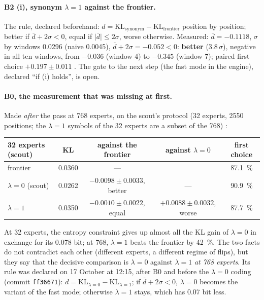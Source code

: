 \paragraph{B2 (i), synonym $\lambda = 1$ against the frontier.} The rule, declared beforehand: $d = \mathrm{KL}_{\text{synonym}} - \mathrm{KL}_{\text{frontier}}$ position by position; better if $\bar d + 2\sigma < 0$, equal if $\lvert \bar d\rvert \le 2\sigma$, worse otherwise. Measured: $\bar d = -\num{0.1118}$, $\sigma$ by windows \num{0.0296} (naive \num{0.0045}), $\bar d + 2\sigma = -\num{0.052} < 0$: \textbf{better} (\num{3.8}\,$\sigma$), negative in all ten windows, from $-\num{0.036}$ (window 4) to $-\num{0.345}$ (window 7); paired first choice $+\num{0.197} \pm \num{0.011}$ \mes. The gate to the next step (the fast mode in the engine), declared ``if (i) holds'', is open.

\paragraph{B0, the measurement that was missing at first.} Made \emph{after} the pass at 768 experts, on the scout's protocol (32 experts, \num{2550} positions; the $\lambda = 1$ symbols of the 32 experts are a subset of the 768) \mes:

\begin{center}\footnotesize
\begin{tabular}{@{}lcccc@{}}
\toprule
32 experts (scout) & KL & against the frontier & against $\lambda = 0$ & first choice \\
\midrule
frontier & \num{0.0360} & --- & & \SI{87.1}{\percent} \\
$\lambda = 0$ (scout) & \num{0.0262} & $-\num{0.0098} \pm \num{0.0033}$, better & --- & \SI{90.9}{\percent} \\
$\lambda = 1$ & \num{0.0350} & $-\num{0.0010} \pm \num{0.0022}$, equal & $+\num{0.0088} \pm \num{0.0032}$, worse & \SI{87.7}{\percent} \\
\bottomrule
\end{tabular}
\end{center}

At 32 experts, the entropy constraint gives up almost all the KL gain of $\lambda = 0$ in exchange for its \num{0.078} bit; at 768, $\lambda = 1$ beats the frontier by \SI{42}{\percent}. The two facts do not contradict each other (different experts, a different regime of flips), but they say that the decisive comparison is $\lambda = 0$ against $\lambda = 1$ \emph{at 768 experts}. Its rule was declared on 17 October at 12:15, after B0 and before the $\lambda = 0$ coding (commit \texttt{ff36671}): $d = \mathrm{KL}_{\lambda=0} - \mathrm{KL}_{\lambda=1}$; if $\bar d + 2\sigma < 0$, $\lambda = 0$ becomes the variant of the fast mode; otherwise $\lambda = 1$ stays, which has 0.07 bit less.

